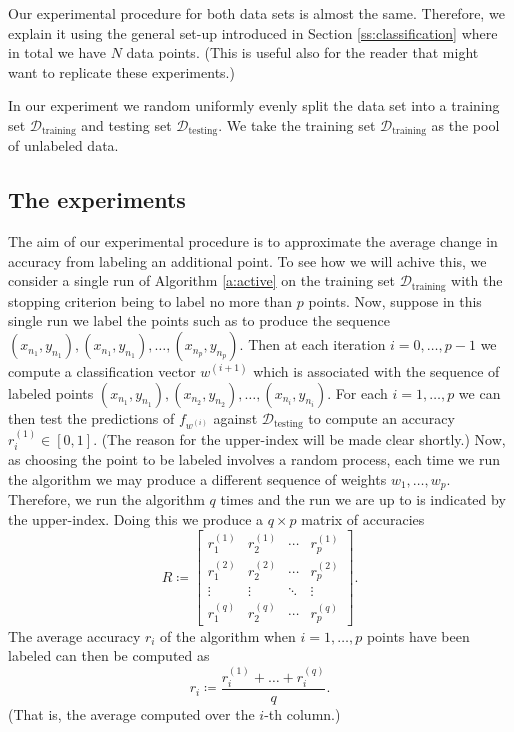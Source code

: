 \documentclass[11pt]{amsart}
\theoremstyle{definition}
\theoremstyle{remark}
\begin{document}
        Our experimental procedure for both data sets is almost the same. Therefore, we explain it using the general set-up introduced in Section \ref{ss:classification} where in total we have $N$ data points. (This is useful also for the reader that might want to replicate these experiments.) 

        In our experiment we random uniformly evenly split the data set into a training set $\mathcal{D}_\text{training}$ and testing set $\mathcal{D}_\text{testing}$. We take the training set $\mathcal{D}_\text{training}$ as the pool of unlabeled data.

    \subsection*{The experiments} 
        The aim of our experimental procedure is to approximate the average change in accuracy from labeling an additional point. To see how we will achive this, we consider a single run of Algorithm \ref{a:active} on the training set $\mathcal{D}_\text{training}$ with the stopping criterion being to label no more than $p$ points. Now, suppose in this single run we label the points such as to produce the sequence $(x_{n_1}, y_{n_1}), (x_{n_1}, y_{n_1}), \dots, (x_{n_{p}}, y_{n_{p}})$. Then at each iteration $i = 0, \dots, p - 1$ we compute a classification vector $w^{(i + 1)}$ which is associated with the sequence of labeled points $(x_{n_1}, y_{n_1}), (x_{n_2}, y_{n_2}), \dots, (x_{n_{i}}, y_{n_{i}})$. For each $i = 1, \dots, p$ we can then test the predictions of $f_{w^{(i)}}$ against $\mathcal{D}_\text{testing}$ to compute an accuracy $r^{(1)}_i \in [0, 1]$. (The reason for the upper-index will be made clear shortly.) Now, as choosing the point to be labeled involves a random process, each time we run the algorithm we may produce a different sequence of weights $w_1, \dots, w_p$. Therefore, we run the algorithm $q$ times and the run we are up to is indicated by the upper-index. Doing this we produce a $q \times p$ matrix of accuracies
        \begin{equation*}
            R \coloneqq \begin{bmatrix}
            r_1^{(1)} &  r_2^{(1)}  & \cdots & r_p^{(1)}\\
            r_1^{(2)}  &  r_2^{(2)} & \cdots & r_p^{(2)}\\
            \vdots & \vdots & \ddots & \vdots\\
            r_1^{(q)}  &  r_2^{(q)}  & \cdots & r_p^{(q)}
            \end{bmatrix}.
        \end{equation*}
        The average accuracy $r_i$ of the algorithm when $i = 1, \dots, p$ points have been labeled can then be computed as
        \begin{equation*}
            r_i \coloneqq \frac{r_i^{(1)} + \dots + r_i^{(q)}}{q}.
        \end{equation*}
        (That is, the average computed over the $i$-th column.)
\end{document}
